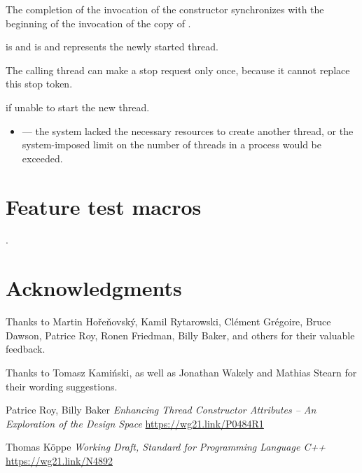 \documentclass{wg21}
\begin{document}
\begin{itemdescr}
\pnum
\sync
The completion of the invocation of the constructor
synchronizes with the beginning of the invocation of the copy of .

\pnum
\ensures
{} is 
and  is 
and  represents the newly started thread.
\begin{note}
The calling thread can make a stop request only once,
because it cannot replace this stop token.
\end{note}

\pnum
\throws
{} if unable to start the new thread.

\pnum
\errors
\begin{itemize}
\item {} --- the system lacked
the necessary resources to create another thread,
or the system-imposed limit on the number of threads in a process
would be exceeded.
\end{itemize}
\end{itemdescr}

\section{Feature test macros}

.


\section{Acknowledgments}

Thanks to Martin Hořeňovský, Kamil Rytarowski, Clément Grégoire, Bruce Dawson, Patrice Roy, Ronen Friedman, Billy Baker, and others for their valuable feedback.

Thanks to Tomasz Kamiński, as well as Jonathan Wakely and Mathias Stearn for their wording suggestions.






\renewcommand{\section}[2]{}%
\begin{thebibliography}{9}
    Patrice Roy, Billy Baker
    \emph{Enhancing Thread Constructor Attributes – An Exploration of the Design Space}\newline
    \url{https://wg21.link/P0484R1}

    Thomas Köppe
    \emph{Working Draft, Standard for Programming Language C++}\newline
    \url{https://wg21.link/N4892}

\end{thebibliography}
\end{document}
